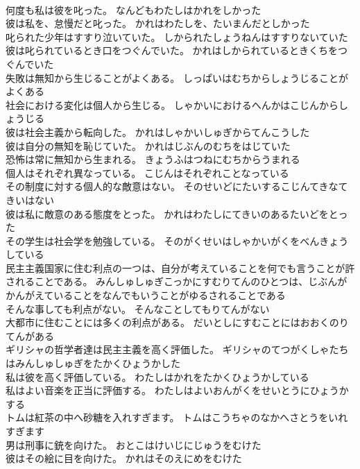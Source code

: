 \documentclass[8pt]{extreport}
\begin{document}
\begin{CJK}{UTF8}{min}
\\	何度も私は彼を叱った。	なんどもわたしはかれをしかった 
\\	彼は私を、怠慢だと叱った。	かれはわたしを、たいまんだとしかった 
\\	叱られた少年はすすり泣いていた。	しかられたしょうねんはすすりないていた 
\\	彼は叱られているとき口をつぐんでいた。	かれはしかられているときくちをつぐんでいた 
\\	失敗は無知から生じることがよくある。	しっぱいはむちからしょうじることがよくある 
\\	社会における変化は個人から生じる。	しゃかいにおけるへんかはこじんからしょうじる 
\\	彼は社会主義から転向した。	かれはしゃかいしゅぎからてんこうした 
\\	彼は自分の無知を恥じていた。	かれはじぶんのむちをはじていた 
\\	恐怖は常に無知から生まれる。	きょうふはつねにむちからうまれる 
\\	個人はそれぞれ異なっている。	こじんはそれぞれことなっている 
\\	その制度に対する個人的な敵意はない。	そのせいどにたいするこじんてきなてきいはない 
\\	彼は私に敵意のある態度をとった。	かれはわたしにてきいのあるたいどをとった 
\\	その学生は社会学を勉強している。	そのがくせいはしゃかいがくをべんきょうしている 
\\	民主主義国家に住む利点の一つは、自分が考えていることを何でも言うことが許されることである。	みんしゅしゅぎこっかにすむりてんのひとつは、じぶんがかんがえていることをなんでもいうことがゆるされることである 
\\	そんな事しても利点がない。	そんなことしてもりてんがない 
\\	大都市に住むことには多くの利点がある。	だいとしにすむことにはおおくのりてんがある 
\\	ギリシャの哲学者達は民主主義を高く評価した。	ギリシャのてつがくしゃたちはみんしゅしゅぎをたかくひょうかした 
\\	私は彼を高く評価している。	わたしはかれをたかくひょうかしている 
\\	私はよい音楽を正当に評価する。	わたしはよいおんがくをせいとうにひょうかする 
\\	トムは紅茶の中へ砂糖を入れすぎます。	トムはこうちゃのなかへさとうをいれすぎます 
\\	男は刑事に銃を向けた。	おとこはけいじにじゅうをむけた 
\\	彼はその絵に目を向けた。	かれはそのえにめをむけた 

\end{CJK}
\end{document}
